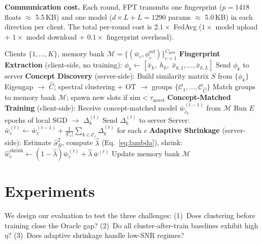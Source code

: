 \documentclass[11pt]{article}
\newcommand{\cC}{\mathcal{C}}
\newcommand{\what}{\hat{w}}
\newcommand{\wbar}{\bar{w}}
\begin{document}
\textbf{Communication cost.}
Each round, FPT transmits one fingerprint ($p = 1418$ floats $\approx$ 5.5\,KB) and one model ($d \times L + L = 1290$ params $\approx$ 5.0\,KB) in each direction per client.
The total per-round cost is $2.1\times$ FedAvg ($1\times$ model upload $+$ $1\times$ model download $+$ $0.1\times$ fingerprint overhead).

\begin{algorithm}[t]
\caption{FedProTrack: One Federation Round}
\label{alg:fpt}
\begin{algorithmic}[1]
\REQUIRE Clients $\{1,\ldots,K\}$, memory bank $\mathcal{M} = \{(\wbar_c, \phi_c^{\mathrm{ref}})\}_{c=1}^{C_{\mathrm{prev}}}$
\STATE \textbf{Fingerprint Extraction} (client-side, no training):
    \STATE $\phi_k \leftarrow [\bar x_k,\; h_k,\; \bar x_{k,1}, \ldots, \bar x_{k,L}]$ 
    \STATE Send $\phi_k$ to server
\ENDFOR
\STATE \textbf{Concept Discovery} (server-side):
\STATE Build similarity matrix $S$ from $\{\phi_k\}$
\STATE Eigengap $\to$ $\hat C$; spectral clustering + OT $\to$ groups $\{\cC_1, \ldots, \cC_{\hat C}\}$
\STATE Match groups to memory bank $\mathcal{M}$; spawn new slots if $\mathrm{sim} < \tau_{\mathrm{novel}}$
\STATE \textbf{Concept-Matched Training} (client-side):
    \STATE Receive concept-matched model $\wbar_{\hat c_k}^{(t-1)}$ from $\mathcal{M}$
    \STATE Run $E$ epochs of local SGD $\to$ $\Delta_k^{(t)}$
    \STATE Send $\Delta_k^{(t)}$ to server
\ENDFOR
\STATE Server: $\wbar_c^{(t)} \leftarrow \wbar_c^{(t-1)} + \frac{1}{|\cC_c|}\sum_{k \in \cC_c} \Delta_k^{(t)}$ for each $c$
\STATE \textbf{Adaptive Shrinkage} (server-side):
\STATE Estimate $\hat\sigma_B^2$, compute $\hat\lambda$ (Eq.~\ref{eq:lambda}), shrink: $\what_c^{\mathrm{shrink}} \leftarrow (1-\hat\lambda)\wbar_c^{(t)} + \hat\lambda\,\wbar^{(t)}$
\STATE Update memory bank $\mathcal{M}$
\end{algorithmic}
\end{algorithm}


\section{Experiments}
\label{sec:experiments}

We design our evaluation to test the three challenges: (1)~Does clustering before training close the Oracle gap? (2)~Do all cluster-after-train baselines exhibit high $\eta$? (3)~Does adaptive shrinkage handle low-SNR regimes?
\end{document}
